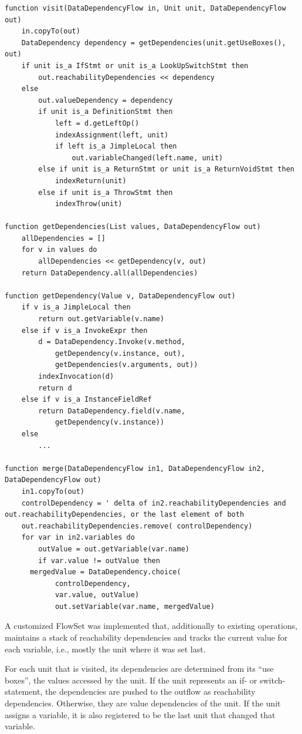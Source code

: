 \documentclass[english]{scrartcl}
\begin{document}
\begin{lstlisting}[firstnumber=1,float,caption={Our dependency algorithm in pseudocode.},stepnumber=5,label=lst:visit,gobble=0,language=algorithm,tabsize=2]
function visit(DataDependencyFlow in, Unit unit, DataDependencyFlow out)
	in.copyTo(out)
	DataDependency dependency = getDependencies(unit.getUseBoxes(), out)
	if unit is_a IfStmt or unit is_a LookUpSwitchStmt then
		out.reachabilityDependencies << dependency
	else
		out.valueDependency = dependency
		if unit is_a DefinitionStmt then
			left = d.getLeftOp()
			indexAssignment(left, unit)
			if left is_a JimpleLocal then
				out.variableChanged(left.name, unit)
		else if unit is_a ReturnStmt or unit is_a ReturnVoidStmt then
			indexReturn(unit)
		else if unit is_a ThrowStmt then
			indexThrow(unit)

function getDependencies(List values, DataDependencyFlow out)
	allDependencies = []
	for v in values do
		allDependencies << getDependency(v, out)
	return DataDependency.all(allDependencies)

function getDependency(Value v, DataDependencyFlow out)
	if v is_a JimpleLocal then
		return out.getVariable(v.name)
	else if v is_a InvokeExpr then
		d = DataDependency.Invoke(v.method,
			getDependency(v.instance, out),
			getDependencies(v.arguments, out))
		indexInvocation(d)
		return d
	else if v is_a InstanceFieldRef
		return DataDependency.field(v.name,
			getDependency(v.instance))
	else 
		...

function merge(DataDependencyFlow in1, DataDependencyFlow in2, DataDependencyFlow out)
	in1.copyTo(out)
	controlDependency = ' delta of in2.reachabilityDependencies and out.reachabilityDependencies, or the last element of both
	out.reachabilityDependencies.remove( controlDependency)
	for var in in2.variables do
		outValue = out.getVariable(var.name)
		if var.value != outValue then
      mergedValue = DataDependency.choice(
            controlDependency, 
            var.value, outValue)
			out.setVariable(var.name, mergedValue)
\end{lstlisting}


A customized FlowSet was implemented that, additionally to existing operations, maintains a stack of reachability dependencies and tracks the current value for each variable, i.e., mostly the unit where it was set last.

For each unit that is visited, its dependencies are determined from its ``use boxes'', the values accessed by the unit.
If the unit represents an if- or switch-statement, the dependencies are pushed to the outflow as reachability dependencies.
Otherwise, they are value dependencies of the unit.
If the unit assigns a variable, it is also registered to be the last unit that changed that variable.
\end{document}
